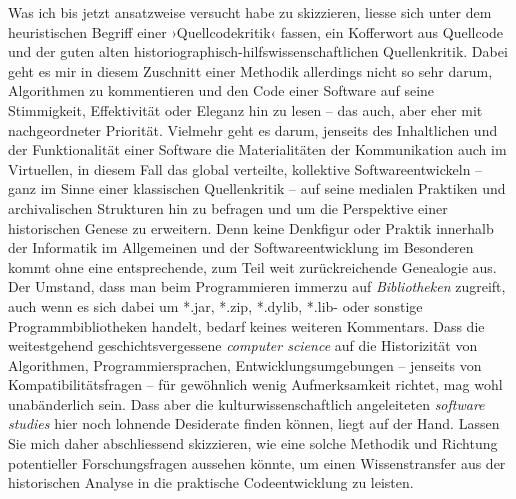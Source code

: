\documentclass[a4paper,11pt]{article}
\newcommand{\inanf}[1]{›#1‹}
\begin{document}


Was ich bis jetzt ansatzweise versucht habe zu skizzieren, liesse sich unter dem heuristischen Begriff einer \inanf{Quellcodekritik} fassen, ein Kofferwort aus Quellcode und der guten alten historiographisch-hilfswissenschaftlichen Quellenkritik. Dabei geht es mir in diesem Zuschnitt einer Methodik allerdings nicht so sehr darum, Algorithmen zu kommentieren und den Code einer Software auf seine Stimmigkeit, Effektivität oder Eleganz hin zu lesen – das auch, aber eher mit nachgeordneter Priorität. Vielmehr geht es darum, jenseits des Inhaltlichen und der Funktionalität einer Software die Materialitäten der Kommunikation auch im Virtuellen, in diesem Fall das global verteilte, kollektive Softwareentwickeln – ganz im Sinne einer klassischen Quellenkritik – auf seine medialen Praktiken und archivalischen Strukturen hin zu befragen und um die Perspektive einer historischen Genese zu erweitern. Denn keine Denkfigur oder Praktik innerhalb der Informatik im Allgemeinen und der Softwareentwicklung im Besonderen kommt ohne eine entsprechende, zum Teil weit zurückreichende Genealogie aus. Der Umstand, dass man beim Programmieren immerzu auf \emph{Bibliotheken} zugreift, auch wenn es sich dabei um *.jar, *.zip, *.dylib, *.lib- oder sonstige Programmbibliotheken handelt, bedarf keines weiteren Kommentars. Dass die weitestgehend geschichtsvergessene \emph{computer science} auf die Historizität von Algorithmen, Programmiersprachen, Entwicklungsumgebungen – jenseits von Kompatibilitätsfragen – für gewöhnlich wenig Aufmerksamkeit richtet, mag wohl unabänderlich sein. Dass aber die kulturwissenschaftlich angeleiteten \emph{software studies} hier noch lohnende Desiderate finden können, liegt auf der Hand. Lassen Sie mich daher abschliessend skizzieren, wie eine solche Methodik und Richtung potentieller Forschungsfragen aussehen könnte, um einen Wissenstransfer aus der historischen Analyse in die praktische Codeentwicklung zu leisten. 
\end{document}
